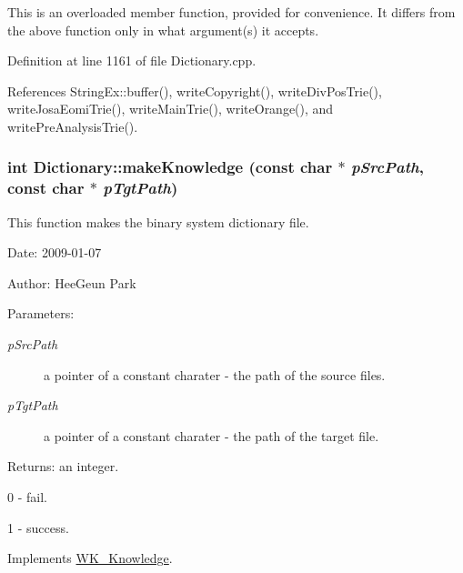 This is an overloaded member function, provided for convenience. It differs from the above function only in what argument(s) it accepts. 

Definition at line 1161 of file Dictionary.cpp.

References StringEx::buffer(), writeCopyright(), writeDivPosTrie(), writeJosaEomiTrie(), writeMainTrie(), writeOrange(), and writePreAnalysisTrie().\hypertarget{classkmaOrange_1_1Dictionary_3f754de6a90c39753b6620f089be7b85}{
\subsubsection[{makeKnowledge}]{\setlength{\rightskip}{0pt plus 5cm}int Dictionary::makeKnowledge (const char $\ast$ {\em pSrcPath}, \/  const char $\ast$ {\em pTgtPath})}}
\label{classkmaOrange_1_1Dictionary_3f754de6a90c39753b6620f089be7b85}


This function makes the binary system dictionary file. 

\begin{Desc}
\item[Date:]2009-01-07 \end{Desc}
\begin{Desc}
\item[Author:]HeeGeun Park \end{Desc}
\begin{Desc}
\item[Parameters:]
\begin{description}
\item[{\em pSrcPath}]a pointer of a constant charater - the path of the source files. \item[{\em pTgtPath}]a pointer of a constant charater - the path of the target file. \end{description}
\end{Desc}
\begin{Desc}
\item[Returns:]an integer.\par
 0 - fail.\par
 1 - success. \end{Desc}


Implements \hyperlink{classWK__Knowledge_0ad630181c1519d316d2d2cdf28a270e}{WK\_\-Knowledge}.

